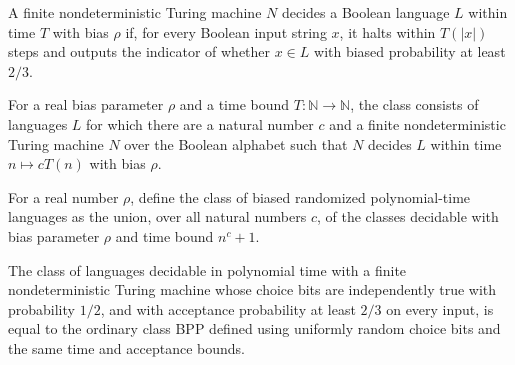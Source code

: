 \begin{definition}
\label{Turing.FinNDTM.BiasedBPDecidesInTime}
\leanok
{}
A finite nondeterministic Turing machine $N$ decides a Boolean language $L$ within time
$T$ with bias $\rho$ if, for every Boolean input string $x$, it halts within $T(|x|)$
steps and outputs the indicator of whether $x\in L$ with biased probability at least
$2/3$.
\end{definition}

\begin{definition}
\label{Randomized.biasedBPTIME}
\leanok
{}
For a real bias parameter $\rho$ and a time bound $T:\mathbb{N}\to\mathbb{N}$, the class
consists of languages $L$ for which there are a natural number $c$ and a finite
nondeterministic Turing machine $N$ over the Boolean alphabet such that $N$ decides $L$
within time $n\mapsto cT(n)$ with bias $\rho$.
\end{definition}

\begin{definition}
\label{Randomized.biasedBPP}
\leanok
{}
For a real number $\rho$, define the class of biased randomized polynomial-time
languages as the union, over all natural numbers $c$, of the classes decidable with bias
parameter $\rho$ and time bound $n^c+1$.
\end{definition}

\begin{theorem}
\label{Randomized.biasedBPP_half}
\leanok
{}
The class of languages decidable in polynomial time with a finite nondeterministic
Turing machine whose choice bits are independently true with probability $1/2$, and with
acceptance probability at least $2/3$ on every input, is equal to the ordinary class BPP
defined using uniformly random choice bits and the same time and acceptance bounds.
\end{theorem}

